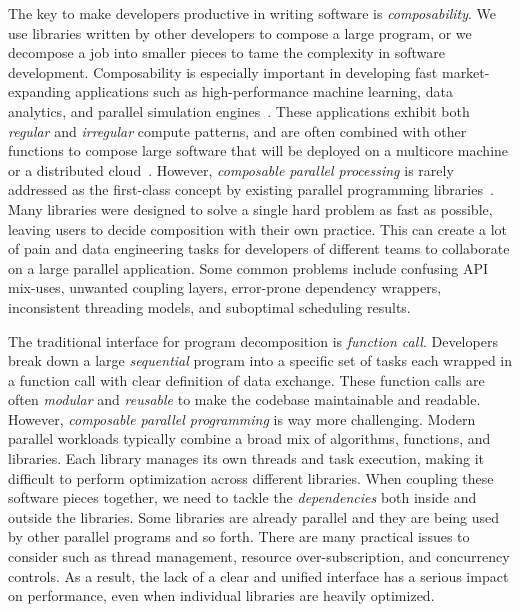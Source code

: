 \documentclass[conference]{IEEEtran}
\begin{document}
The key to make developers productive in writing software is \textit{composability}.
We use libraries written by other developers to compose a large program,
or we decompose a job into smaller pieces to tame the complexity
in software development.
Composability is especially important in developing fast market-expanding applications
such as high-performance machine learning, data analytics, 
and parallel simulation engines~\cite{Sculley_15_01}.
These applications exhibit both \textit{regular} and \textit{irregular} compute patterns,
and are often combined with other functions to compose large software 
that will be deployed on a multicore machine 
or a distributed cloud~\cite{Ayguad_2018, task_taxonomy}.
However, \textit{composable parallel processing} is rarely addressed 
as the first-class concept by existing parallel programming libraries~\cite{Palkar_18_01}.
Many libraries were designed to solve a single hard problem as fast as possible,
leaving users to decide composition with their own practice.
This can create a lot of pain and data engineering tasks for developers of different teams
to collaborate on a large parallel application.
Some common problems include confusing API mix-uses,
unwanted coupling layers,
error-prone dependency wrappers, inconsistent threading models, 
and suboptimal scheduling results.

The traditional interface for program decomposition is \textit{function call}.
Developers break down a large \textit{sequential} program into a specific set of tasks
each wrapped in a function call with clear definition of data exchange.
These function calls are often \textit{modular} and \textit{reusable} 
to make the codebase maintainable and readable.
However, \textit{composable parallel programming} is way more challenging.
Modern parallel workloads typically combine a broad mix of algorithms, functions, and libraries.
Each library manages its own threads and task execution, 
making it difficult to perform optimization across different libraries.
When coupling these software pieces together,
we need to tackle the \textit{dependencies} both inside and outside the libraries.
Some libraries are already parallel and they are being used by
other parallel programs and so forth.
There are many practical issues to consider such as
thread management, resource over-subscription, and concurrency controls.
As a result, the lack of a clear and unified interface has a serious impact on performance,
even when individual libraries are heavily optimized.
\end{document}
